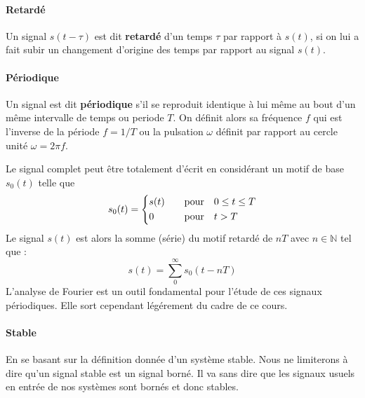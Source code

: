 \paragraph{Retardé}
Un signal $s(t-\tau)$ est dit \textbf{retardé} d'un temps $\tau$ 
par rapport à $s(t)$, si on lui a fait subir un changement
d'origine des temps par rapport au signal $s(t)$.
\begin{center}
    
\end{center}

\paragraph{Périodique}
Un signal est dit \textbf{périodique} s'il se reproduit identique à lui
même au bout d'un même intervalle de temps ou periode $T$. On définit alors 
sa fréquence $f$ qui est l'inverse de la période $f=1/T$ ou la pulsation 
$\omega$ définit par rapport au cercle unité $\omega=2\pi f$.

\begin{figure}[!htb]
    \centering
    
\end{figure}
Le signal complet peut être totalement d'écrit en considérant un motif de base 
$s_0(t)$ telle que
\begin{align*}
s_0(t) =
\begin{dcases}
    s(t)&\quad\text{pour}\quad 0\le t\le T   \\
    0&\quad\text{pour}\quad t>T
\end{dcases}
\end{align*}
Le signal $s(t)$ est alors la somme (série) du motif retardé de $nT$ 
avec $n\in\mathbb{N}$ tel que :
$$
s(t)=\sum_0^\infty s_0(t-nT)
$$
L'analyse de Fourier est un outil fondamental pour l'étude 
de ces signaux périodiques. Elle sort cependant légérement du cadre de 
ce cours.

\paragraph{Stable}
En se basant sur la définition donnée d'un système stable.
Nous ne limiterons à dire qu'un signal stable est un signal 
borné. Il va sans dire que les signaux usuels en entrée
de nos systèmes sont bornés et donc stables.


